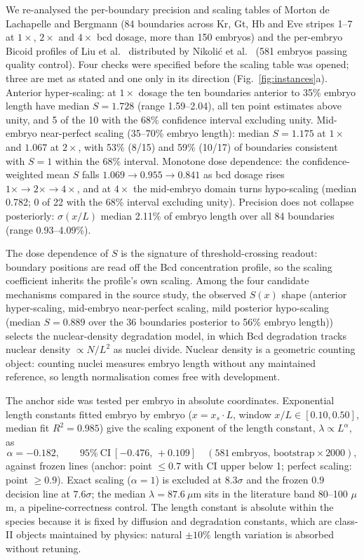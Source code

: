 \documentclass[11pt,a4paper]{article}
\begin{document}
We re-analysed the per-boundary precision and scaling tables of Morton de Lachapelle and Bergmann \cite{Bergmann2010} (84 boundaries across Kr, Gt, Hb and Eve stripes 1--7 at $1\times$, $2\times$ and $4\times$ bcd dosage, more than 150 embryos) and the per-embryo Bicoid profiles of Liu et al.\ \cite{Liu2013} distributed by Nikoli\'c et al.\ \cite{Nikolic2023} (581 embryos passing quality control). Four checks were specified before the scaling table was opened; three are met as stated and one only in its direction (Fig.~\ref{fig:instances}a). Anterior hyper-scaling: at $1\times$ dosage the ten boundaries anterior to 35\% embryo length have median $S=1.728$ (range 1.59--2.04), all ten point estimates above unity, and 5 of the 10 with the 68\% confidence interval excluding unity. Mid-embryo near-perfect scaling (35--70\% embryo length): median $S=1.175$ at $1\times$ and $1.067$ at $2\times$, with 53\% (8/15) and 59\% (10/17) of boundaries consistent with $S=1$ within the 68\% interval. Monotone dose dependence: the confidence-weighted mean $S$ falls $1.069\to0.955\to0.841$ as bcd dosage rises $1\times\to2\times\to4\times$, and at $4\times$ the mid-embryo domain turns hypo-scaling (median 0.782; 0 of 22 with the 68\% interval excluding unity). Precision does not collapse posteriorly: $\sigma(x/L)$ median 2.11\% of embryo length over all 84 boundaries (range 0.93--4.09\%).

The dose dependence of $S$ is the signature of threshold-crossing readout: boundary positions are read off the Bcd concentration profile, so the scaling coefficient inherits the profile's own scaling. Among the four candidate mechanisms compared in the source study, the observed $S(x)$ shape (anterior hyper-scaling, mid-embryo near-perfect scaling, mild posterior hypo-scaling (median $S=0.889$ over the 36 boundaries posterior to 56\% embryo length)) selects the nuclear-density degradation model, in which Bcd degradation tracks nuclear density $\propto N/L^2$ as nuclei divide. Nuclear density is a geometric counting object: counting nuclei measures embryo length without any maintained reference, so length normalisation comes free with development.

The anchor side was tested per embryo in absolute coordinates. Exponential length constants fitted embryo by embryo ($x=x_s\cdot L$, window $x/L\in[0.10,0.50]$, median fit $R^2=0.985$) give the scaling exponent of the length constant, $\lambda\propto L^{\alpha}$, as
\begin{equation}
\alpha=-0.182,\qquad 95\%\ \mathrm{CI}\ [-0.476,\,+0.109]\quad(581\ \text{embryos, bootstrap}\times2000),
\label{eq:alpha}
\end{equation}
against frozen lines (anchor: point $\le0.7$ with CI upper below 1; perfect scaling: point $\ge0.9$). Exact scaling ($\alpha=1$) is excluded at $8.3\sigma$ and the frozen $0.9$ decision line at $7.6\sigma$; the median $\lambda=87.6\ \mu$m sits in the literature band 80--100 $\mu$m, a pipeline-correctness control. The length constant is absolute within the species because it is fixed by diffusion and degradation constants, which are class-II objects maintained by physics: natural $\pm10\%$ length variation is absorbed without retuning.
\end{document}
